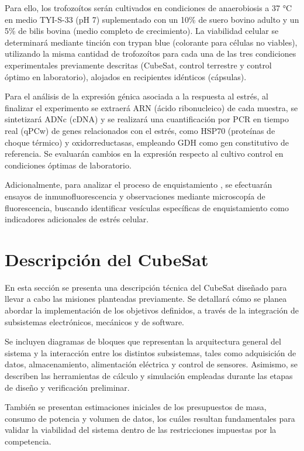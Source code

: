    Para ello, los trofozoítos serán cultivados en condiciones de anaerobiosis a 37 °C en medio TYI-S-33 (pH 7) suplementado con
   un 10\% de suero bovino adulto y un 5\% de bilis bovina (medio completo de crecimiento). La viabilidad celular se determinará
   mediante tinción con trypan blue (colorante para células no viables), utilizando la misma cantidad de trofozoítos para cada
   una de las tres condiciones experimentales previamente descritas (CubeSat, control terrestre y control óptimo en laboratorio),
   alojados en recipientes idénticos (cápsulas).

   Para el análisis de la expresión génica asociada a la respuesta al estrés, al finalizar el experimento se extraerá ARN
   (ácido ribonucleico) de cada muestra, se sintetizará ADNc (cDNA) y se realizará una cuantificación por PCR en tiempo real
   (qPCw) de genes relacionados con el estrés, como HSP70 (proteínas de choque térmico) y oxidorreductasas, empleando GDH
   como gen constitutivo de referencia. Se evaluarán cambios en la expresión respecto al cultivo control en condiciones óptimas de
   laboratorio.

   Adicionalmente, para analizar el proceso de enquistamiento , se efectuarán ensayos de inmunofluorescencia y
   observaciones mediante microscopía de fluorescencia, buscando identificar vesículas específicas de enquistamiento
   como indicadores adicionales de estrés celular.
  
  \section{Descripción del CubeSat}
  En esta sección se presenta una descripción técnica del CubeSat diseñado para llevar a cabo las misiones planteadas
  previamente. Se detallará cómo se planea abordar la implementación de los objetivos definidos, a través de la
  integración de subsistemas electrónicos, mecánicos y de software.

  Se incluyen diagramas de bloques que representan la arquitectura general del sistema y la interacción entre los
  distintos subsistemas, tales como adquisición de datos, almacenamiento, alimentación eléctrica y control de
  sensores.  Asimismo, se describen las herramientas de cálculo y simulación empleadas durante las etapas de diseño y
  verificación preliminar.

  También se presentan estimaciones iniciales de los presupuestos de masa, consumo de potencia y volumen de datos, los
  cuáles resultan fundamentales para validar la viabilidad del sistema dentro de las restricciones impuestas por la
  competencia.

